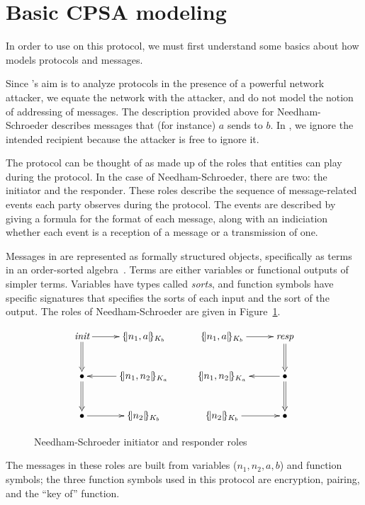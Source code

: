 \section{Basic CPSA modeling}
\label{sec:basic}

In order to use {\cpsa} on this protocol,
we must first understand some basics about how {\cpsa} models protocols
and messages.

Since {\cpsa}'s aim is to analyze protocols in the presence of a
powerful network attacker, we equate the network with the attacker,
and do not model the notion of addressing of messages.  The
description provided above for Needham-Schroeder describes messages
that (for instance) $a$ sends to $b$.  In {\cpsa}, we ignore the
intended recipient because the attacker is free to ignore it.

The protocol can be thought of as made up of the roles that entities
can play during the protocol.  In the case of Needham-Schroeder, there
are two: the initiator and the responder.  These roles describe the
sequence of message-related events each party observes during the
protocol.  The events are described by giving a formula for the format
of each message, along with an indiciation whether each event is a
reception of a message or a transmission of one.

Messages in {\cpsa} are represented as formally structured objects,
specifically as terms in an order-sorted
algebra~\cite{GoguenMeseguer92}.  Terms are either variables or
functional outputs of simpler terms.  Variables have types called
\emph{sorts}, and function symbols have specific signatures that
specifies the sorts of each input and the sort of the output.  The
roles of Needham-Schroeder are given in Figure~\ref{fig:ns roles}.

\begin{figure}
\begin{center}
\[\xymatrix{
\textit{init}\ar[r]\ar@{=>}[d]&\enc{n_1, a}{K_b}&\enc{n_1,a}{K_b}\ar[r]&\textit{resp}\ar@{=>}[d]\\
\bullet\ar@{=>}[d]&\enc{n_1, n_2}{K_a}\ar[l]&\enc{n_1, n_2}{K_a}&\bullet\ar[l]\ar@{=>}[d]\\
\bullet\ar[r]&\enc{n_2}{K_b}&\enc{n_2}{K_b}\ar[r]&\bullet}\]
\end{center}
\caption[Needham-Schroeder roles]{Needham-Schroeder initiator and responder roles}
\label{fig:ns roles}
\end{figure}

The messages in these roles are built from variables ($n_1, n_2, a,
b$) and function symbols; the three function symbols used in this
protocol are encryption, pairing, and the ``key of'' function.

